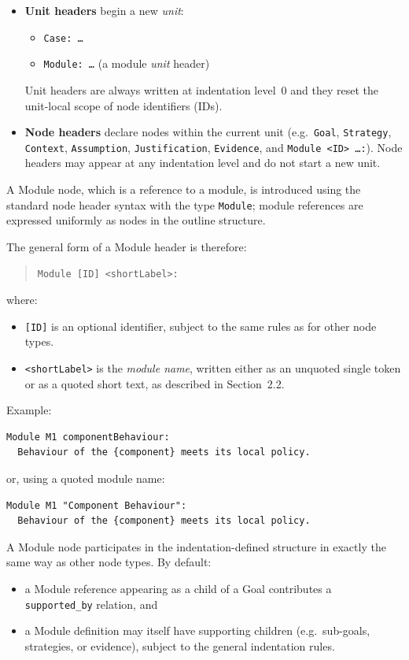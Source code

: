 \documentclass[11pt,twoside,a4paper]{article}
\begin{document}
\begin{itemize}[leftmargin=2em]
  \item \textbf{Unit headers} begin a new \emph{unit}:
  \begin{itemize}[leftmargin=1.5em]
    \item \texttt{Case: \dots}
    \item \texttt{Module: \dots} (a module \emph{unit} header)
  \end{itemize}
  Unit headers are always written at indentation level~0 and they reset the unit-local scope of node identifiers (IDs).
  \item \textbf{Node headers} declare nodes within the current unit (e.g.\ \texttt{Goal}, \texttt{Strategy}, \texttt{Context}, \texttt{Assumption}, \texttt{Justification}, \texttt{Evidence}, and \texttt{Module <ID> \dots :}).
  Node headers may appear at any indentation level and do not start a new unit.
\end{itemize}

A Module node, which is a reference to a module, is introduced using the standard node header syntax with the type
\texttt{Module};
module references are expressed uniformly as nodes in the outline structure.

The general form of a Module header is therefore:
\begin{quote}
\texttt{Module [ID] \textless shortLabel\textgreater:}
\end{quote}

where:
\begin{itemize}[leftmargin=2em]
  \item \texttt{[ID]} is an optional identifier, subject to the same rules as for other node types.
  \item \texttt{\textless shortLabel\textgreater{}} is the \emph{module name}, written either as an
        unquoted single token or as a quoted short text, as described in Section~2.2.
\end{itemize}

Example:
\begin{verbatim}
Module M1 componentBehaviour:
  Behaviour of the {component} meets its local policy.
\end{verbatim}

or, using a quoted module name:
\begin{verbatim}
Module M1 "Component Behaviour":
  Behaviour of the {component} meets its local policy.
\end{verbatim}

A Module node participates in the indentation-defined structure in exactly the same way as
other node types. By default:
\begin{itemize}[leftmargin=2em]
  \item a Module reference appearing as a child of a Goal contributes a
        \texttt{supported\_by} relation, and
  \item a Module definition may itself have supporting children (e.g.\ sub-goals, strategies, or evidence),
        subject to the general indentation rules.
\end{itemize}
\end{document}
